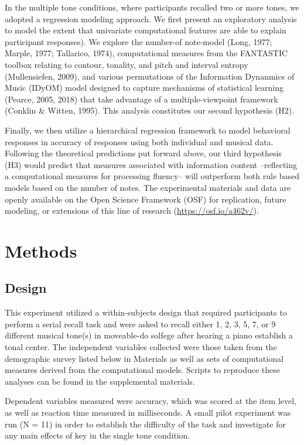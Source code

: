 \documentclass[english,man,floatsintext]{apa6}
\begin{document}
In the multiple tone conditions, where participants recalled two or more tones, we adopted a regression modeling approach.
We first present an exploratory analysis to model the extent that univariate computational features are able to explain participant responses).
We explore the number-of note-model (Long, 1977; Marple, 1977; Tallarico, 1974), computational measures from the FANTASTIC toolbox relating to contour, tonality, and pitch and interval entropy (Mullensiefen, 2009), and various permutations of the Information Dynanmics of Music (IDyOM) model designed to capture mechanisms of statistical learning (Pearce, 2005, 2018) that take advantage of a multiple-viewpoint framework (Conklin \& Witten, 1995).
This analysis constitutes our second hypothesis (H2).

Finally, we then utilize a hierarchical regression framework to model behavioral responses in accuracy of responses using both individual and musical data.
Following the theoretical predictions put forward above, our third hypothesis (H3) would predict that measures associated with information content --reflecting a computational measures for processing fluency-- will outperform both rule based models based on the number of notes.
The experimental materials and data are openly available on the Open Science Framework (OSF) for replication, future modeling, or extensions of this line of research (\url{https://osf.io/a462v/}).

\hypertarget{methods}{%
\section{Methods}\label{methods}}

\hypertarget{design}{%
\subsection{Design}\label{design}}

This experiment utilized a within-subjects design that required participants to perform a serial recall task and were asked to recall either 1, 2, 3, 5, 7, or 9 different musical tone(s) in moveable-do solfege after hearing a piano establish a tonal center.
The independent variables collected were those taken from the demographic survey listed below in Materials as well as sets of computational measures derived from the computational models.
Scripts to reproduce these analyses can be found in the supplemental materials.

Dependent variables measured were accuracy, which was scored at the item level, as well as reaction time measured in milliseconds.
A small pilot experiment was run (N = 11) in order to establish the difficulty of the task and investigate for any main effects of key in the single tone condition.
\end{document}
